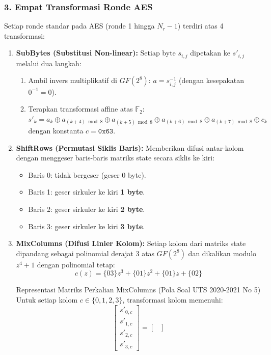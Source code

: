 \documentclass[11pt,a4paper]{article}
\begin{document}
\subsubsection{3. Empat Transformasi Ronde AES}
Setiap ronde standar pada AES (ronde 1 hingga $N_r - 1$) terdiri atas 4 transformasi:
\begin{enumerate}[leftmargin=*]
    \item \textbf{SubBytes (Substitusi Non-linear):} Setiap byte $s_{i,j}$ dipetakan ke $s'_{i,j}$ melalui dua langkah:
    \begin{enumerate}
        \item Ambil invers multiplikatif di $GF(2^8)$: $a = s_{i,j}^{-1}$ (dengan kesepakatan $0^{-1} = 0$).
        \item Terapkan transformasi affine atas $\mathbb{F}_2$: $s'_k = a_k \oplus a_{(k+4)\bmod 8} \oplus a_{(k+5)\bmod 8} \oplus a_{(k+6)\bmod 8} \oplus a_{(k+7)\bmod 8} \oplus c_k$ dengan konstanta $c = \mathtt{0x63}$.
    \end{enumerate}
    \item \textbf{ShiftRows (Permutasi Siklis Baris):} Memberikan difusi antar-kolom dengan menggeser baris-baris matriks state secara siklis ke kiri:
    \begin{itemize}
        \item Baris 0: tidak bergeser (geser 0 byte).
        \item Baris 1: geser sirkuler ke kiri \textbf{1 byte}.
        \item Baris 2: geser sirkuler ke kiri \textbf{2 byte}.
        \item Baris 3: geser sirkuler ke kiri \textbf{3 byte}.
    \end{itemize}
    \item \textbf{MixColumns (Difusi Linier Kolom):} Setiap kolom dari matriks state dipandang sebagai polinomial derajat 3 atas $GF(2^8)$ dan dikalikan modulo $z^4 + 1$ dengan polinomial tetap:
    \[
    c(z) = \{03\}z^3 + \{01\}z^2 + \{01\}z + \{02\}
    \]
    \begin{thmbox}{Representasi Matriks Perkalian MixColumns (Pola Soal UTS 2020-2021 No 5)}
    Untuk setiap kolom $c \in \{0, 1, 2, 3\}$, transformasi kolom memenuhi:
    \[
    \begin{bmatrix}
    s'_{0,c} \\ s'_{1,c} \\ s'_{2,c} \\ s'_{3,c}
    \end{bmatrix}
    =
    \begin{bmatrix}

\end{bmatrix}\]
\end{thmbox}
\end{enumerate}
\end{document}
